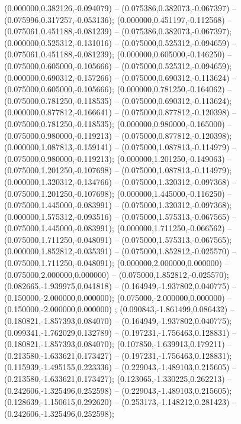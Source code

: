  (0.000000,0.382126,-0.094079) -- (0.075386,0.382073,-0.067397) -- (0.075996,0.317257,-0.053136);
 (0.000000,0.451197,-0.112568) -- (0.075061,0.451188,-0.081239) -- (0.075386,0.382073,-0.067397);
 (0.000000,0.525312,-0.131016) -- (0.075000,0.525312,-0.094659) -- (0.075061,0.451188,-0.081239);
 (0.000000,0.605000,-0.146250) -- (0.075000,0.605000,-0.105666) -- (0.075000,0.525312,-0.094659);
 (0.000000,0.690312,-0.157266) -- (0.075000,0.690312,-0.113624) -- (0.075000,0.605000,-0.105666);
 (0.000000,0.781250,-0.164062) -- (0.075000,0.781250,-0.118535) -- (0.075000,0.690312,-0.113624);
 (0.000000,0.877812,-0.166641) -- (0.075000,0.877812,-0.120398) -- (0.075000,0.781250,-0.118535);
 (0.000000,0.980000,-0.165000) -- (0.075000,0.980000,-0.119213) -- (0.075000,0.877812,-0.120398);
 (0.000000,1.087813,-0.159141) -- (0.075000,1.087813,-0.114979) -- (0.075000,0.980000,-0.119213);
 (0.000000,1.201250,-0.149063) -- (0.075000,1.201250,-0.107698) -- (0.075000,1.087813,-0.114979);
 (0.000000,1.320312,-0.134766) -- (0.075000,1.320312,-0.097368) -- (0.075000,1.201250,-0.107698);
 (0.000000,1.445000,-0.116250) -- (0.075000,1.445000,-0.083991) -- (0.075000,1.320312,-0.097368);
 (0.000000,1.575312,-0.093516) -- (0.075000,1.575313,-0.067565) -- (0.075000,1.445000,-0.083991);
 (0.000000,1.711250,-0.066562) -- (0.075000,1.711250,-0.048091) -- (0.075000,1.575313,-0.067565);
 (0.000000,1.852812,-0.035391) -- (0.075000,1.852812,-0.025570) -- (0.075000,1.711250,-0.048091);
 (0.000000,2.000000,0.000000) -- (0.075000,2.000000,0.000000) -- (0.075000,1.852812,-0.025570);
 (0.082665,-1.939975,0.041818) -- (0.164949,-1.937802,0.040775) -- (0.150000,-2.000000,0.000000);
 (0.075000,-2.000000,0.000000) -- (0.150000,-2.000000,0.000000) ;
 (0.090843,-1.861499,0.086432) -- (0.180821,-1.857393,0.084070) -- (0.164949,-1.937802,0.040775);
 (0.099341,-1.762029,0.132789) -- (0.197231,-1.756463,0.128831) -- (0.180821,-1.857393,0.084070);
 (0.107850,-1.639913,0.179211) -- (0.213580,-1.633621,0.173427) -- (0.197231,-1.756463,0.128831);
 (0.115939,-1.495155,0.223336) -- (0.229043,-1.489103,0.215605) -- (0.213580,-1.633621,0.173427);
 (0.123065,-1.330225,0.262213) -- (0.242606,-1.325496,0.252598) -- (0.229043,-1.489103,0.215605);
 (0.128639,-1.150615,0.292620) -- (0.253173,-1.148212,0.281423) -- (0.242606,-1.325496,0.252598);
